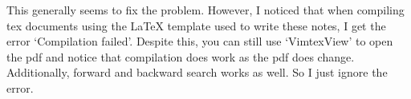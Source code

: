 This generally seems to fix the problem. However, I noticed that when compiling
tex documents using the LaTeX template used to write these notes, I get the
error `Compilation failed'. Despite this, you can still use `VimtexView' to open the
pdf and notice that compilation does work as the pdf does change. Additionally,
forward and backward search works as well. So I just ignore the error.
